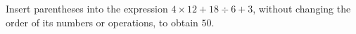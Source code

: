 Insert parentheses into the expression $4\times12+18\div6+3$, without changing the order of its numbers or operations, to obtain $50$.
